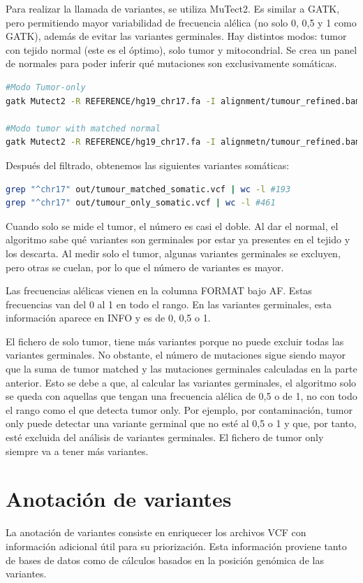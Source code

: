 Para realizar la llamada de variantes, se utiliza MuTect2. Es similar a GATK, pero permitiendo mayor variabilidad de frecuencia alélica (no solo 0, 0,5 y 1 como GATK), además de evitar las variantes germinales. Hay distintos modos: tumor con tejido normal (este es el óptimo), solo tumor y mitocondrial. Se crea un panel de normales para poder inferir qué mutaciones son exclusivamente somáticas. 
\begin{lstlisting}[language=bash]
#Modo Tumor-only 
gatk Mutect2 -R REFERENCE/hg19_chr17.fa -I alignment/tumour_refined.bam -O tumour_only_somatic.vcf

#Modo tumor with matched normal
gatk Mutect2 -R REFERENCE/hg19_chr17.fa -I alignmetn/tumour_refined.bam -I alignment/normal_refined.bam -normal Normal -O out/tumour_matched_somatic.vcf
\end{lstlisting}
 
Después del filtrado, obtenemos las siguientes variantes somáticas:
\begin{lstlisting}[language=bash]
grep "^chr17" out/tumour_matched_somatic.vcf | wc -l #193
grep "^chr17" out/tumour_only_somatic.vcf | wc -l #461
\end{lstlisting}
Cuando solo se mide el tumor, el número es casi el doble. Al dar el normal, el algoritmo sabe qué variantes son germinales por estar ya presentes en el tejido y los descarta. Al medir solo el tumor, algunas variantes germinales se excluyen, pero otras se cuelan, por lo que el número de variantes es mayor. 

Las frecuencias alélicas vienen en la columna FORMAT bajo AF. Estas frecuencias van del 0 al 1 en todo el rango. En las variantes germinales, esta información aparece en INFO y es de 0, 0,5 o 1. 

El fichero de solo tumor, tiene más variantes porque no puede excluir todas las variantes germinales. No obstante, el número de mutaciones sigue siendo mayor que la suma de tumor matched y las mutaciones germinales calculadas en la parte anterior. Esto se debe a que, al calcular las variantes germinales, el algoritmo solo se queda con aquellas que tengan una frecuencia alélica de 0,5 o de 1, no con todo el rango como el que detecta tumor only. Por ejemplo, por contaminación, tumor only puede detectar una variante germinal que no esté al 0,5 o 1 y que, por tanto, esté excluida del análisis de variantes germinales. El fichero de tumor only siempre va a  tener más variantes.

\chapter{Anotación de variantes}
La anotación de variantes consiste en enriquecer los archivos VCF con información adicional útil para su priorización. Esta información proviene tanto de bases de datos como de cálculos basados en la posición genómica de las variantes.

